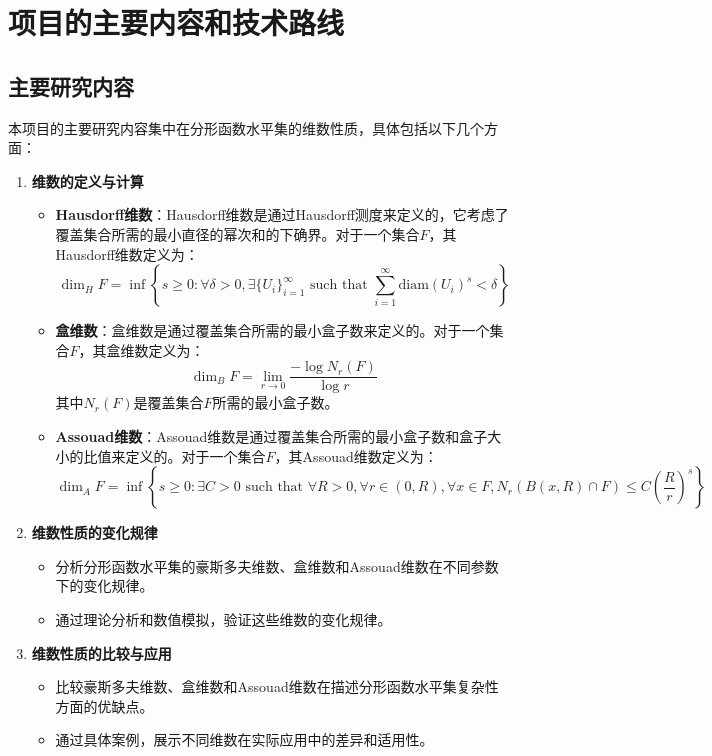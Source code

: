 \section{项目的主要内容和技术路线}

\subsection{主要研究内容}
\label{sec:main_content}

本项目的主要研究内容集中在分形函数水平集的维数性质，具体包括以下几个方面：

\begin{enumerate}
      \item \textbf{维数的定义与计算}
      \begin{itemize}
            \item \textbf{Hausdorff维数}：Hausdorff维数是通过Hausdorff测度来定义的，它考虑了覆盖集合所需的最小直径的幂次和的下确界。对于一个集合\(F\)，其Hausdorff维数定义为：
            \[
            \dim_H F = \inf \left\{ s \geq 0 : \forall \delta > 0, \exists \{U_i\}_{i=1}^\infty \text{ such that } \sum_{i=1}^\infty \text{diam}(U_i)^s < \delta \right\}
            \]
            \item \textbf{盒维数}：盒维数是通过覆盖集合所需的最小盒子数来定义的。对于一个集合\(F\)，其盒维数定义为：
            \[
            \dim_B F = \lim_{r \to 0} \frac{-\log N_r(F)}{\log r}
            \]
            其中\(N_r(F)\)是覆盖集合\(F\)所需的最小盒子数。
            \item \textbf{Assouad维数}：Assouad维数是通过覆盖集合所需的最小盒子数和盒子大小的比值来定义的。对于一个集合\(F\)，其Assouad维数定义为：
            \[
            \dim_A F = \inf \left\{ s \geq 0 : \exists C > 0 \text{ such that } \forall R > 0, \forall r \in (0, R), \forall x \in F, N_r(B(x, R) \cap F) \leq C \left( \frac{R}{r} \right)^s \right\}
            \]
      \end{itemize}
      \item \textbf{维数性质的变化规律}
      \begin{itemize}
            \item 分析分形函数水平集的豪斯多夫维数、盒维数和Assouad维数在不同参数下的变化规律。
            \item 通过理论分析和数值模拟，验证这些维数的变化规律。
      \end{itemize}
      \item \textbf{维数性质的比较与应用}
      \begin{itemize}
            \item 比较豪斯多夫维数、盒维数和Assouad维数在描述分形函数水平集复杂性方面的优缺点。
            \item 通过具体案例，展示不同维数在实际应用中的差异和适用性。
      \end{itemize}
\end{enumerate}

